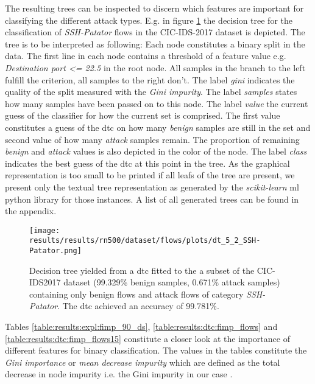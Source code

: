 The resulting trees can be inspected to discern which features are important for classifying the different attack types. E.g. in figure \ref{fig:results:dtc:cic2017:ssh_patator} the decision tree for the classification of \textit{SSH-Patator} flows in the CIC-IDS-2017 dataset is depicted. The tree is to be interpreted as following: Each node constitutes a binary split in the data. The first line in each node contains a threshold of a feature value e.g. \textit{Destination port <= 22.5} in the root node. All samples in the branch to the left fulfill the criterion, all samples to the right don't. The label \textit{gini} indicates the quality of the split measured with the \textit{Gini impurity}. The label \textit{samples} states how many samples have been passed on to this node. The label \textit{value} the current guess of the classifier for how the current set is comprised. The first value constitutes a guess of the \gls{dtc} on how many \textit{benign} samples are still in the set and second value of how many \textit{attack} samples remain. The proportion of remaining \textit{benign} and \textit{attack} values is also depicted in the color of the node. The label \textit{class} indicates the best guess of the \gls{dtc} at this point in the tree. As the graphical representation is too small to be printed if all leafs of the tree are present, we present only the textual tree representation as generated by the \textit{scikit-learn} \gls{ml} python library \cite{sklearn} for those instances. A list of all generated trees can be found in the appendix. \par

\begin{figure}[]
	\centering
	\texttt{[image: results/results/rn500/dataset/flows/plots/dt\_5\_2\_SSH-Patator.png]}
	\caption{Decision tree yielded from a \gls{dtc} fitted to the a subset of the CIC-IDS2017 dataset (99.329\% benign samples, 0.671\% attack samples) containing only benign flows and attack flows of category \textit{SSH-Patator}. The \gls{dtc} achieved an accuracy of 99.781\%.}
	\label{fig:results:dtc:cic2017:ssh_patator}
\end{figure}

Tables \ref{table:results:expl:fimp_90_ds}, \ref{table:results:dtc:fimp_flows} and \ref{table:results:dtc:fimp_flows15} constitute a closer look at the importance of different features for binary classification. The values in the tables constitute the \textit{Gini importance} or \textit{mean decrease impurity} which are defined as the total decrease in node impurity i.e. the Gini impurity in our case \cite{sklearn}. \par

